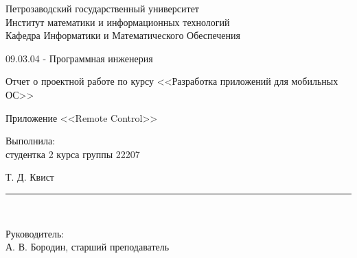 \documentclass[a4paper,12pt]{article}
\newcommand{\myrule}[1]{\rule{#1}{0.4pt}}
\newcommand{\sign}[2][~]{{\small\myrule{#2}\\[-0.7em]\makebox[#2]{\it #1}}}
\renewcommand{\baselinestretch}{1.50}
\begin{document}

\thispagestyle{empty}
\begin{center}


\renewcommand{\baselinestretch}{1}
{\large
{\sc Петрозаводский государственный университет\\
Институт математики и информационных технологий\\
	Кафедра Информатики и Математического Обеспечения
}
}

\end{center}


\begin{center}
%
%
09.03.04 - Программная инженерия \\
%
% 
\end{center}

\vfill

\begin{center}
{\normalsize Отчет о проектной работе по курсу <<Разработка приложений для мобильных ОС>>} \\

\medskip

	{\Large \sc Приложение <<Remote Control>>} \\
\end{center}

\medskip

\begin{flushright}
\parbox{11cm}{%
\renewcommand{\baselinestretch}{1.2}
\normalsize
	Выполнила:\\
студентка 2 курса группы 22207
\begin{flushright}
	Т. Д. Квист \sign[подпись]{4cm}
\end{flushright}

Руководитель:\\
А. В. Бородин, старший преподаватель \\

}
\end{flushright}
\end{document}
